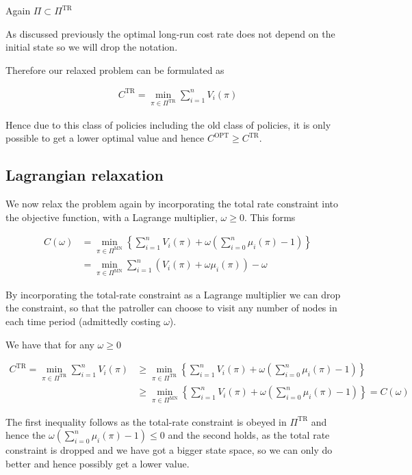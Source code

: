 \documentclass[a4paper,10pt]{article}
\theoremstyle{definition}
\theoremstyle{definition}
\theoremstyle{remark}
\theoremstyle{definition}
\begin{document}
Again $\Pi \subset \Pi^{\text{TR}}$

As discussed previously the optimal long-run cost rate does not depend on the initial state so we will drop the notation.

Therefore our relaxed problem can be formulated as

\begin{align*}
C^{\text{TR}}=\min_{\pi \in \Pi^{\text{TR}}} \sum\limits_{i=1}^{n} V_{i}(\pi)
\end{align*}

Hence due to this class of policies including the old class of policies, it is only possible to get a lower optimal value and hence $C^{\text{OPT}} \geq C^{\text{TR}}$.

\subsection{Lagrangian relaxation}
We now relax the problem again by incorporating the total rate constraint into the objective function, with a Lagrange multiplier, $\omega \geq 0$. This forms

\begin{align*}
C(\omega)&=\min_{\pi \in \Pi^{\text{MN}}} \left\{ \sum\limits_{i=1}^{n} V_{i}(\pi) + \omega \left( \sum\limits_{i=0}^{n} \mu_{i}(\pi) -1 \right) \right\} \\
&=\min_{\pi \in \Pi^{\text{MN}}} \sum\limits_{i=1}^{n} (V_{i}(\pi)+\omega \mu_{i}(\pi)) - \omega
\end{align*}

By incorporating the total-rate constraint as a Lagrange multiplier we can drop the constraint, so that the patroller can choose to visit any number of nodes in each time period (admittedly costing $\omega$).

We have that for any $\omega \geq 0$

\begin{align*}
C^{\text{TR}}=\min_{\pi \in \Pi^{\text{TR}}} \sum\limits_{i=1}^{n} V_{i}(\pi) &\geq \min_{\pi \in \Pi^{\text{TR}}} \left\{ \sum\limits_{i=1}^{n} V_{i}(\pi) + \omega \left( \sum\limits_{i=0}^{n} \mu_{i}(\pi) -1 \right) \right\} \\
&\geq \min_{\pi \in \Pi^{\text{MN}}} \left\{ \sum\limits_{i=1}^{n} V_{i}(\pi) + \omega \left( \sum\limits_{i=0}^{n} \mu_{i}(\pi) -1 \right) \right\}=C(\omega)
\end{align*}

The first inequality follows as the total-rate constraint is obeyed in $\Pi^{\text{TR}}$ and hence the $\omega \left( \sum\limits_{i=0}^{n} \mu_{i}(\pi) -1 \right) \leq 0$ and the second holds, as the total rate constraint is dropped and we have got a bigger state space, so we can only do better and hence possibly get a lower value.
\end{document}
